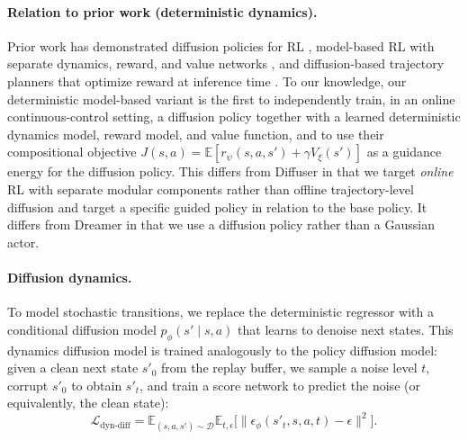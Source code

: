 \documentclass{article}
\theoremstyle{plain}
\theoremstyle{definition}
\theoremstyle{remark}
\newcommand{\E}{\mathbb{E}}
\begin{document}
\paragraph{Relation to prior work (deterministic dynamics).}
Prior work has demonstrated diffusion policies for RL \citep{ma2025soft}, model-based RL with separate dynamics, reward, and value networks \citep{hafner2020dreamer,schrittwieser2020muzero}, and diffusion-based trajectory planners that optimize reward at inference time \citep{janner2022diffuser}.
To our knowledge, our deterministic model-based variant is the first to independently train, in an online continuous-control setting, a diffusion policy together with a learned deterministic dynamics model, reward model, and value function, and to use their compositional objective $J(s,a) = \E[r_\psi(s,a,s') + \gamma V_\xi(s')]$ as a guidance energy for the diffusion policy.
This differs from Diffuser in that we target \emph{online} RL with separate modular components rather than offline trajectory-level diffusion and target a specific guided policy in relation to the base policy. It differs from Dreamer in that we use a diffusion policy rather than a Gaussian actor.

\paragraph{Diffusion dynamics.}
To model stochastic transitions, we replace the deterministic regressor with a conditional diffusion model $p_\phi(s'\mid s,a)$ that learns to denoise next states.
This dynamics diffusion model is trained analogously to the policy diffusion model: given a clean next state $s'_0$ from the replay buffer, we sample a noise level $t$, corrupt $s'_0$ to obtain $s'_t$, and train a score network to predict the noise (or equivalently, the clean state):
\begin{equation}
  \mathcal{L}_{\text{dyn-diff}} = \E_{(s,a,s')\sim\mathcal{D}}\E_{t,\epsilon}\bigl[\|\epsilon_\phi(s'_t, s, a, t) - \epsilon\|^2\bigr].
\end{equation}
\end{document}
